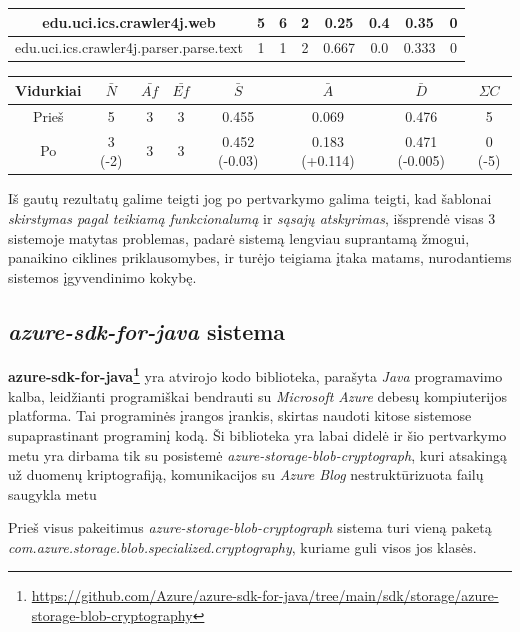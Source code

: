 \begin{center}
\begin{tabular}{|c|c|c|c|c|c|c|c|}
        \hline
        edu.uci.ics.crawler4j.web & 5 & 6 & 2 & 0.25 & 0.4 & 0.35 & 0 \\
        \hline
        edu.uci.ics.crawler4j.parser.parse.text & 1 & 1 & 2 & 0.667 & 0.0 & 0.333 & 0 \\
        \hline
    \end{tabular}
    \begin{tabular}{|c|c|c|c|c|c|c|c|}
        \hline
        Vidurkiai & $\bar{N}$ & $\bar{Af}$ & $\bar{Ef}$ & $\bar{S}$ & $\bar{A}$ & $\bar{D}$ & $\Sigma C$ \\ [0.5ex]
        \hline\hline
        Prieš & 5 & 3 & 3 & 0.455 & 0.069 & 0.476 & 5\\
        \hline
        Po  & \cellcolor{green!25} 3 (-2) & 3 & 3 & \cellcolor{green!24} 0.452 (-0.03) & \cellcolor{green!25} 0.183 (+0.114) & \cellcolor{green!25} 0.471 (-0.005) & \cellcolor{green!25} 0 (-5)\\
        \hline
    \end{tabular}
\end{center}
Iš gautų rezultatų galime teigti jog po pertvarkymo galima teigti, kad šablonai \textit{skirstymas pagal teikiamą funkcionalumą} ir \textit{sąsajų atskyrimas}, išsprendė visas 3 sistemoje matytas problemas,
padarė sistemą lengviau suprantamą žmogui, panaikino ciklines priklausomybes, ir turėjo teigiama įtaka matams, nurodantiems
sistemos įgyvendinimo kokybę.


\subsection{\textit{azure-sdk-for-java} sistema}
\textbf{azure-sdk-for-java\footnote{\url{https://github.com/Azure/azure-sdk-for-java/tree/main/sdk/storage/azure-storage-blob-cryptography}}} yra atvirojo kodo
biblioteka, parašyta \textit{Java} programavimo kalba, leidžianti programiškai bendrauti su \textit{Microsoft Azure} debesų kompiuterijos platforma.
Tai programinės įrangos įrankis, skirtas naudoti kitose sistemose supaprastinant programinį kodą.
Ši biblioteka yra labai didelė ir šio pertvarkymo metu yra dirbama tik su posistemė \textit{azure-storage-blob-cryptograph}, kuri atsakingą už duomenų kriptografiją,
komunikacijos su \textit{Azure Blog} nestruktūrizuota failų saugykla metu

Prieš visus pakeitimus \textit{azure-storage-blob-cryptograph} sistema turi vieną paketą \textit{com.azure.storage.blob.specialized.cryptography}, kuriame guli visos jos klasės.

